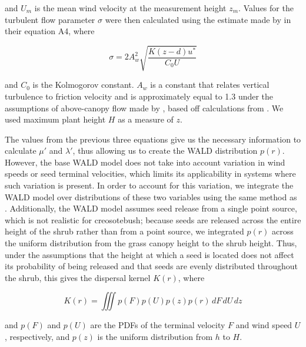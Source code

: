 \documentclass[11pt]{article}\usepackage[]{graphicx}\usepackage[usenames,dvipsnames]{xcolor}
\begin{document}
and $U_{m}$ is the mean wind velocity at the measurement height $z_{m}$.
Values for the turbulent flow parameter $\sigma$ were then calculated using the estimate made by \citet{skarpaas2007dispersal} in their equation A4, where 

\begin{linenomath*} \begin{equation} \sigma = 2A_{w}^2 \sqrt{\frac{K(z-d)u^*}{C_{0}U}} \end{equation} 
\end{linenomath*} 

and $C_{0}$ is the Kolmogorov constant.
$A_{w}$ is a constant that relates vertical turbulence to friction velocity and is approximately equal to 1.3 under the assumptions of above-canopy flow made by \citet{skarpaas2007dispersal}, based off calculations from \citet{hsieh1997dissipation}.
We used maximum plant height $H$ as a measure of $z$.

The values from the previous three equations give us the necessary information to calculate $\mu'$ and $\lambda'$, thus allowing us to create the WALD distribution $p(r)$.
However, the base WALD model does not take into account variation in wind speeds or seed terminal velocities, which limits its applicability in systems where such variation is present.
In order to account for this variation, we integrate the WALD model over distributions of these two variables using the same method as \citet{skarpaas2007dispersal}.
Additionally, the WALD model assumes seed release from a single point source, which is not realistic for creosotebush; because seeds are released across the entire height of the shrub rather than from a point source, we integrated $p(r)$ across the uniform distribution from the grass canopy height to the shrub height.
Thus, under the assumptions that the height at which a seed is located does not affect its probability of being released and that seeds are evenly distributed throughout the shrub, this gives the dispersal kernel $K(r)$, where

\begin{linenomath*} \begin{equation} K(r) = \iiint p(F)p(U)p(z)p(r) \,dF\,dU\,dz \end{equation} 
\end{linenomath*} 

and $p(F)$ and $p(U)$ are the PDFs of the terminal velocity $F$ and wind speed $U$, respectively, and $p(z)$ is the uniform distribution from $h$ to $H$.
\end{document}
